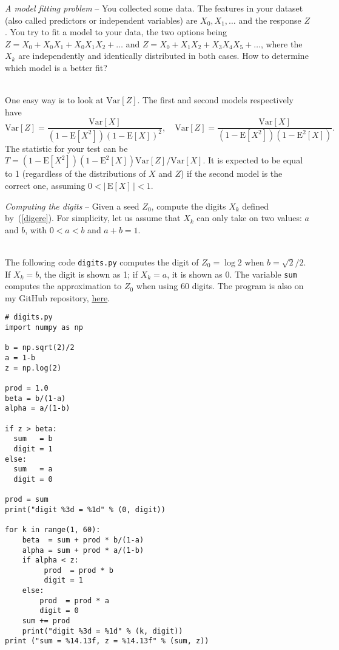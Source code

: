 \documentclass[oneside,10pt]{book}
\begin{document}
\begin{Exercise}\label{p} {\em A model fitting problem} --  You collected some data. The
 features in your dataset (also called predictors or independent variables) are $X_0, X_1,\dots$ and the
 response $Z$. You try to fit a model to your data, the two options being
$Z = X_0 + X_0X_1+X_0X_1 X_2+\dots$ and $Z = X_0 + X_1X_2+X_3X_4 X_5+\dots$, where the $X_k$ are independently and identically
 distributed in both cases. How to determine which model is a better fit?
\vspace{1ex}

 \\
One easy way is to look at $\text{Var}[Z]$. The first and second models respectively have
$$
 \text{Var}[Z] = \frac{\text{Var}[X]}{(1-\text{E}[X^2])(1-\text{E}[X])^2}, 
\quad \text{Var}[Z]=\frac{\text{Var}[X]}{(1 - \text{E}[X^2]) (1 - \text{E}^2[X])}.
$$
The statistic for your test can be $T =  (1 - \text{E}[X^2]) (1 - \text{E}^2[X]) \text{Var}[Z]/ \text{Var}[X]$. It is expected
 to be equal to 1 (regardless of the distributions of $X$ and $Z$) if the second model is the correct one, assuming $0 < |\, \text{E}[X] \,| < 1$.
\end{Exercise}


\begin{Exercise}\label{polcjon} {\em Computing the digits} -- Given a seed $Z_0$, compute
  the digits $X_k$ defined by~(\ref{digere}). For simplicity, let us assume that $X_k$ can only take on two values: $a$ and $b$,
with $0<a<b$ and $a+b=1$.  \vspace{1ex}

 \\
The following code \texttt{digits.py} computes the digit of $Z_0 = \log 2$ when $b = \sqrt{2}/2$. 
If $X_k=b$, the digit is shown as 1; if $X_k=a$, it is shown as 0. The variable \texttt{sum} computes the approximation
 to $Z_0$ when using 60 digits. The program is also on my GitHub repository, 
 \href{https://github.com/VincentGranville/Stochastic-Processes/blob/master/digits.py}{here}.\vspace{1ex}
\begin{lstlisting}
# digits.py
import numpy as np

b = np.sqrt(2)/2   
a = 1-b
z = np.log(2)  

prod = 1.0
beta = b/(1-a)
alpha = a/(1-b)

if z > beta: 
  sum   = b
  digit = 1
else:
  sum   = a
  digit = 0

prod = sum
print("digit %3d = %1d" % (0, digit))

for k in range(1, 60):
    beta  = sum + prod * b/(1-a)  
    alpha = sum + prod * a/(1-b)
    if alpha < z:
         prod  = prod * b
         digit = 1
    else: 
        prod  = prod * a
        digit = 0
    sum += prod 
    print("digit %3d = %1d" % (k, digit))
print ("sum = %14.13f, z = %14.13f" % (sum, z))
\end{lstlisting}
\end{Exercise}
\end{document}
